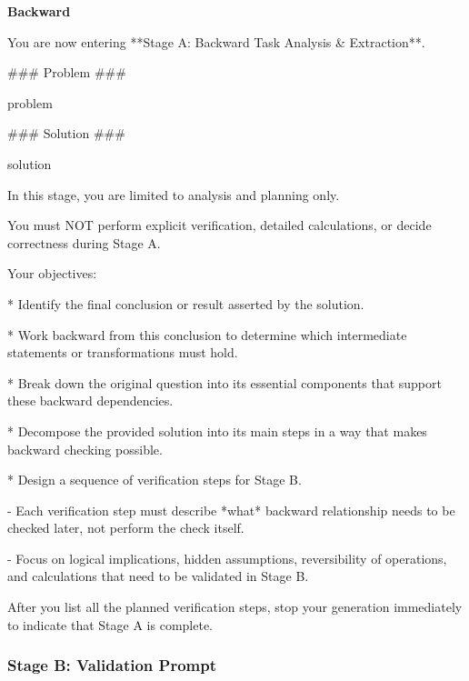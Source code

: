 \documentclass[11pt]{article}
\begin{document}
\noindent\textbf{Backward}
\begin{promptbox}
You are now entering **Stage A: Backward Task Analysis \& Extraction**.

### Problem ###

{problem}

### Solution ###

{solution}

In this stage, you are limited to analysis and planning only.

You must NOT perform explicit verification, detailed calculations, or decide correctness during Stage A.

Your objectives:

* Identify the final conclusion or result asserted by the solution.

* Work backward from this conclusion to determine which intermediate statements or transformations must hold.

* Break down the original question into its essential components that support these backward dependencies.

* Decompose the provided solution into its main steps in a way that makes backward checking possible.

* Design a sequence of verification steps for Stage B.

  - Each verification step must describe *what* backward relationship needs to be checked later, not perform the check itself.
  
  - Focus on logical implications, hidden assumptions, reversibility of operations, and calculations that need to be validated in Stage B.

After you list all the planned verification steps, stop your generation immediately to indicate that Stage A is complete.
\end{promptbox}

\subsubsection{Stage B: Validation Prompt}
\label{sec:appendix_steps_prompt}
\end{document}
